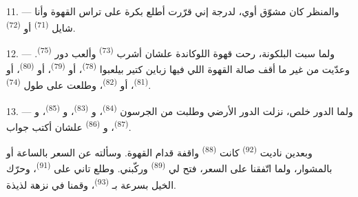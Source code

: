 \VUsaut{3.0mm}
\VUsaut{3.0mm}

11. --- والمنظر كان مشوّق أوي، لدرجة إني قرّرت أطلع بكرة على تراس القهوة وأنا
شايل  \textsuperscript{(71)} أو 
\textsuperscript{(72)}.

12. --- ولما سبت البلكونة، رحت قهوة اللوكاندة علشان أشرب 
\textsuperscript{(73)} وألعب دور  \textsuperscript{(75)}. وعدّيت من غير
ما أقف صالة القهوة اللي فيها زباين كتير بيلعبوا  \textsuperscript{(78)}،
أو  \textsuperscript{(79)}، أو  \textsuperscript{(80)}، أو
 \textsuperscript{(81)}، أو  \textsuperscript{(82)}، وطلعت
على طول  \textsuperscript{(74)}.

13. --- ولما الدور خلص، نزلت الدور الأرضي وطلبت من الجرسون 
\textsuperscript{(84)}، و \textsuperscript{(83)}، و
\textsuperscript{(85)}، و \textsuperscript{(87)}، و
\textsuperscript{(86)} علشان أكتب جواب.

وبعدين ناديت  \textsuperscript{(92)} كانت 
\textsuperscript{(88)} واقفة قدام القهوة. وسألته عن السعر بالساعة أو بالمشوار، ولما
اتّفقنا على السعر، فتح لي  \textsuperscript{(89)} وركّبني. وطلع
تاني على  \textsuperscript{(91)}، وحرّك الخيل بسرعة بـ
\textsuperscript{(93)}، وقمنا في نزهة لذيذة.

\VUsaut{6.0mm}
\VUfilet{22mm}
